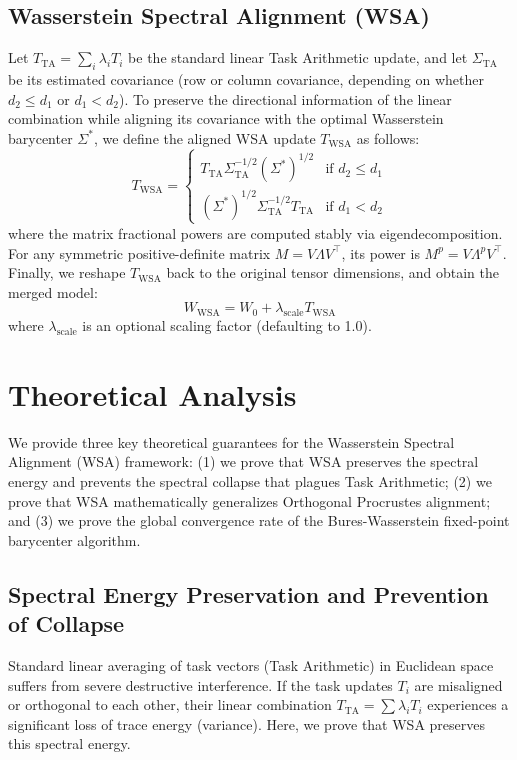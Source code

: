 \documentclass{article}
\theoremstyle{plain}
\theoremstyle{definition}
\theoremstyle{remark}
\begin{document}
\subsection{Wasserstein Spectral Alignment (WSA)}
Let $T_{\text{TA}} = \sum_i \lambda_i T_i$ be the standard linear Task Arithmetic update, and let $\Sigma_{\text{TA}}$ be its estimated covariance (row or column covariance, depending on whether $d_2 \leq d_1$ or $d_1 < d_2$).
To preserve the directional information of the linear combination while aligning its covariance with the optimal Wasserstein barycenter $\Sigma^*$, we define the aligned WSA update $T_{\text{WSA}}$ as follows:
\begin{equation}
  T_{\text{WSA}} = 
  \begin{cases}
    T_{\text{TA}} \Sigma_{\text{TA}}^{-1/2} (\Sigma^*)^{1/2} & \text{if } d_2 \leq d_1 \\
    (\Sigma^*)^{1/2} \Sigma_{\text{TA}}^{-1/2} T_{\text{TA}} & \text{if } d_1 < d_2
  \end{cases}
\end{equation}
where the matrix fractional powers are computed stably via eigendecomposition. For any symmetric positive-definite matrix $M = V \Lambda V^\top$, its power is $M^p = V \Lambda^p V^\top$.
Finally, we reshape $T_{\text{WSA}}$ back to the original tensor dimensions, and obtain the merged model:
\begin{equation}
  W_{\text{WSA}} = W_0 + \lambda_{\text{scale}} T_{\text{WSA}}
\end{equation}
where $\lambda_{\text{scale}}$ is an optional scaling factor (defaulting to 1.0).

\section{Theoretical Analysis}
\label{submission-theory}

We provide three key theoretical guarantees for the Wasserstein Spectral Alignment (WSA) framework: (1) we prove that WSA preserves the spectral energy and prevents the spectral collapse that plagues Task Arithmetic; (2) we prove that WSA mathematically generalizes Orthogonal Procrustes alignment; and (3) we prove the global convergence rate of the Bures-Wasserstein fixed-point barycenter algorithm.

\subsection{Spectral Energy Preservation and Prevention of Collapse}
Standard linear averaging of task vectors (Task Arithmetic) in Euclidean space suffers from severe destructive interference. If the task updates $T_i$ are misaligned or orthogonal to each other, their linear combination $T_{\text{TA}} = \sum \lambda_i T_i$ experiences a significant loss of trace energy (variance). Here, we prove that WSA preserves this spectral energy.
\end{document}
